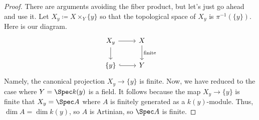 \documentclass[../notes.tex]{subfiles}
\begin{document}
\begin{proof}
	There are arguments avoiding the fiber product, but let's just go ahead and use it. Let $X_y\coloneqq X\times_Y\{y\}$ so that the topological space of $X_y$ is $\pi^{-1}(\{y\})$. Here is our diagram.
	\[\begin{tikzcd}
		{X_y} & X \\
		{\{y\}} & Y
		\arrow[from=1-1, to=1-2]
		\arrow["{\text{finite}}", from=1-2, to=2-2]
		\arrow[hook, from=2-1, to=2-2]
		\arrow[from=1-1, to=2-1]
	\end{tikzcd}\]
	Namely, the canonical projection $X_y\to\{y\}$ is finite. Now, we have reduced to the case where $Y=\Spec k(y)$ is a field. It follows because the map $X_y\to\{y\}$ is finite that $X_y=\Spec A$ where $A$ is finitely generated as a $k(y)$-module. Thus, $\dim A=\dim k(y)$, so $A$ is Artinian, so $\Spec A$ is finite.
\end{proof}
\end{document}
